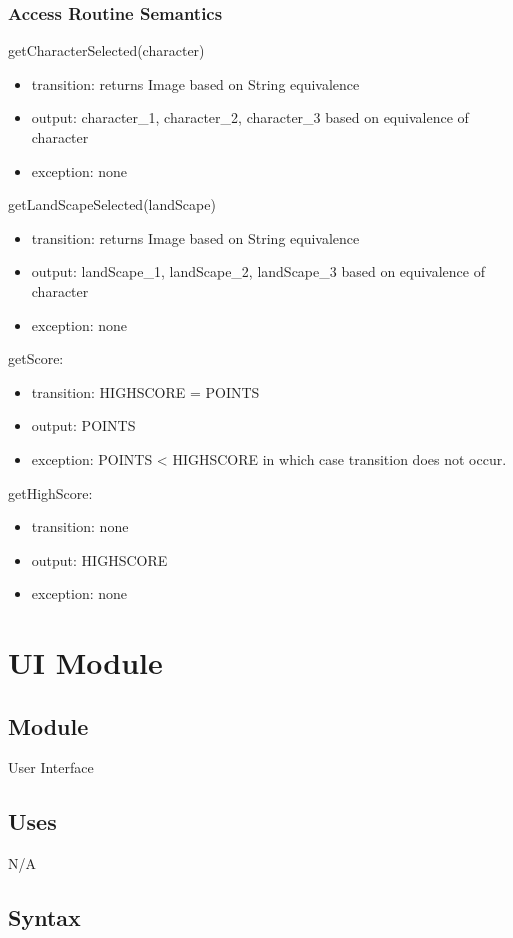 \documentclass[12pt, titlepage]{article}
\begin{document}
\subsubsection{Access Routine Semantics}
getCharacterSelected(character)
\begin{itemize}
\item transition: returns Image based on String equivalence
\item output:  character\_1, character\_2, character\_3  based on equivalence of character
\item exception: none
\end{itemize}
\noindent getLandScapeSelected(landScape)
\begin{itemize}
\item transition: returns Image based on String equivalence
\item output: landScape\_1, landScape\_2, landScape\_3  based on equivalence of character
\item exception: none
\end{itemize}
\noindent getScore:
\begin{itemize}
\item transition: HIGHSCORE = POINTS
\item output: POINTS
\item exception: POINTS < HIGHSCORE in which case transition does not occur.
\end{itemize}
\noindent getHighScore:
\begin{itemize}
\item transition: none
\item output: HIGHSCORE
\item exception: none
\end{itemize}

\newpage
\section {UI Module}
\subsection{Module}
User Interface
\subsection {Uses}
N/A
\subsection {Syntax}
\end{document}
